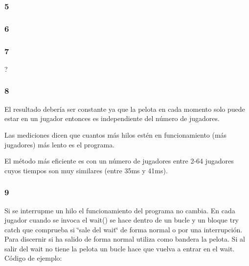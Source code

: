\subsubsection*{5}


\begin{DoxyItemize}
\item \subsubsection*{6}
\end{DoxyItemize}


\begin{DoxyItemize}
\item \subsubsection*{7}
\end{DoxyItemize}

?

\subsubsection*{8}




\begin{DoxyItemize}
\item El resultado debería ser constante ya que la pelota en cada momento solo puede estar en un jugador entonces es independiente del número de jugadores.
\item Las mediciones dicen que cuantos más hilos estén en funcionamiento (más jugadores) más lento es el programa.
\item El método más eficiente es con un número de jugadores entre 2-\/64 jugadores cuyos tiempos son muy similares (entre 35ms y 41ms).
\end{DoxyItemize}

\subsubsection*{9}

Si se interrupme un hilo el funcionamiento del programa no cambia. En cada jugador cuando se invoca el {\ttfamily wait()} se hace dentro de un bucle y un bloque {\ttfamily try catch} que comprueba si \char`\"{}sale del wait\char`\"{} de forma normal o por una interrupción. Para discernir si ha salido de forma normal utiliza como bandera la pelota. Si al salir del wait no tiene la pelota un bucle hace que vuelva a entrar en el wait. Código de ejemplo\-:


